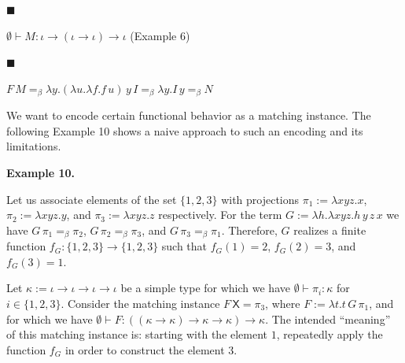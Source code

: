 \par\noindent  $\blacksquare$ 
 
$\emptyset\vdash M:\iota\to(\iota\to\iota)\to\iota$ (Example 6)\par
 
 
 
\par\noindent  $\blacksquare$ 
 
$F\,M=_{\beta}\lambda y.(\lambda u.\lambda f.f\,u)\,y\,I=_{\beta}\lambda y.I\,y%
=_{\beta}N$\par
 
 
  
 
 
 
We want to encode certain functional behavior as a matching instance. The following Example 10 shows a naive approach to such an encoding and its limitations.\par
 
 
 
\par\medskip\noindent\textbf{Example 10.}\par
 
 
Let us associate elements of the set $\{1,2,3\}$ with projections $\pi_{1}:=\lambda xyz.x$, $\pi_{2}:=\lambda xyz.y$, and $\pi_{3}:=\lambda xyz.z$ respectively. For the term $G:=\lambda h.\lambda xyz.h\,y\,z\,x$ we have $G\,\pi_{1}=_{\beta}\pi_{2}$, $G\,\pi_{2}=_{\beta}\pi_{3}$, and $G\,\pi_{3}=_{\beta}\pi_{1}$. Therefore, $G$ realizes a finite function $f_{G}:\{1,2,3\}\to\{1,2,3\}$ such that $f_{G}(1)=2$, $f_{G}(2)=3$, and $f_{G}(3)=1$.\par
 
 
 
Let $\kappa:=\iota\to\iota\to\iota\to\iota$ be a simple type for which we have $\emptyset\vdash\pi_{i}:\kappa$ for $i\in\{1,2,3\}$. Consider the matching instance $F\,\mathsf{X}=\pi_{3}$, where $F:=\lambda t.t\,G\,\pi_{1}$, and for which we have $\emptyset\vdash F:((\kappa\to\kappa)\to\kappa\to\kappa)\to\kappa$. The intended “meaning” of this matching instance is: starting with the element $1$, repeatedly apply the function $f_{G}$ in order to construct the element $3$.\par
 
